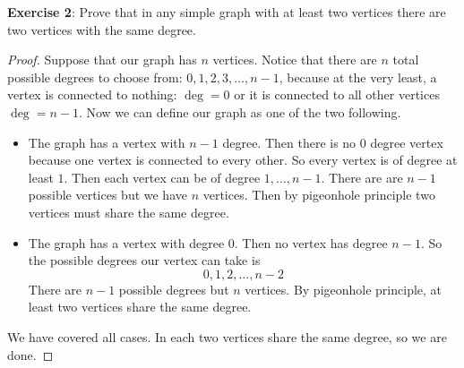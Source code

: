 \documentclass{article}
\begin{document}
\textbf{Exercise 2}: Prove that in any simple graph with at least two vertices there are two vertices with the same degree.
    \begin{proof}
        Suppose that our graph has $n$ vertices. Notice that there are $n$ total possible degrees to choose from: $0, 1,  2, 3, \ldots, n - 1$, because at the very least, a vertex is connected to nothing: $\deg = 0$ or it is connected to all other vertices $\deg = n - 1$. Now we can define our graph as one of the two following.
            \begin{itemize}
                \item The graph has a vertex with $n - 1$ degree. Then there is no $0$ degree vertex because one vertex is connected to every other. So every vertex is of degree at least $1$. Then each vertex can be of degree $1, \ldots, n - 1$. There are are $n - 1$ possible vertices but we have $n$ vertices. Then by pigeonhole principle two vertices must share the same degree.

                \item The graph has a vertex with degree $0$. Then no vertex has degree $n - 1$. So the possible degrees our vertex can take is
                    \begin{equation*}
                        0, 1, 2, \ldots, n - 2
                    \end{equation*}
                There are $n - 1$ possible degrees but $n$ vertices. By pigeonhole principle, at least two vertices share the same degree.
            \end{itemize}
        We have covered all cases. In each two vertices share the same degree, so we are done.
    \end{proof}
\end{document}
